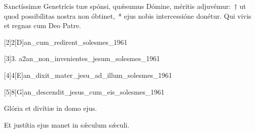 \documentclass[vesperale_romanum.tex]{subfiles}
\begin{document}
\label{hy_te_joseph_celebrent_solesmes}





\label{or_19_mar}

\oratio
\lettrine{S}{a}nctíssimæ Genetrícis tuæ spónsi, quǽsumus Dómine, méritis adjuvémur:~† ut quod possibílitas nostra non óbtinet,~* ejus nobis intercessióne donétur.
Qui vivis et regnas cum Deo Patre.

\commferiae

\newpage



[2]{2}[D]{an_cum_redirent_solesmes_1961}


[3]{3. a2}{an_non_invenientes_jesum_solesmes_1961}


[4]{4}[E]{an_dixit_mater_jesu_ad_illum_solesmes_1961}


[5]{8}[G]{an_descendit_jesus_cum_eis_solesmes_1961}


\vv Glória et divítiæ in domo ejus.

\rr Et justítia ejus manet in sǽculum sǽculi.


\commferiae

\myrule

\newpage


\end{document}
